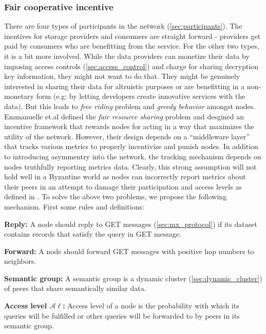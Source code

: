 \subsubsection{Fair cooperative incentive} \label{sec:fair_incentive}
There are four types of participants in the network (\cref{sec:participants}). The inentives for storage providers and consumers are straight forward - providers get paid by consumers who are benefitting from the service. For the other two types, it is a bit more involved. While the data providers can monetize their data by imposing access controls (\cref{sec:access_control}) and charge for sharing decryption key information, they might not want to do that. They might be genuinely interested in sharing their data for altruistic purposes or are benefitting in a non-monetary form (e.g: by letting developers create innovative services with the data). But this leads to \textit{free riding} problem and \textit{greedy behavior} amongst nodes. Emmanuelle et.al \cite{fair_incentives} defined the \textit{fair resource sharing} problem and desgined an incentive framework that rewards nodes for acting in a way that maximizes the utility of the network. However, their design depends on a ``middleware layer'' that tracks various metrics to properly incentivize and punish nodes. In addition to introducing asymmentry into the network, the tracking mechanism depends on nodes truthfully reporting metrics data. Clearly, this strong assumption will not hold well in a Byzantine world as nodes can incorrectly report metrics about their peers in an attempt to damage their participation and access levels as defined in \cite{fair_incentives}. To solve the above two problems, we propose the following mechanism. First some rules and definitions:
\begin{remark}{\textbf{Reply:}} \label{reply_rule}
	A node should reply to \textsf{GET} messages (\cref{sec:mx_protocol}) if its dataset contains records that satisfy the query in \textsf{GET} message.
\end{remark}
\begin{remark}{\textbf{Forward:}} \label{forward_rule}
	A node should forward \textsf{GET} messages with positive hop numbers to neighbors.
\end{remark}
\begin{definition}{\textbf{Semantic group:}} \label{def:sem_group}
	A semantic group is a dynamic cluster (\cref{sec:dynamic_cluster}) of peers that share semantically similar data.
\end{definition}
\begin{definition}{\textbf{Access level $\mathcal{A}\ell$:}}
	Access level of a node is the probability with which its queries will be fulfilled or other queries will be forwarded to by peers in its semantic group.
\end{definition}
